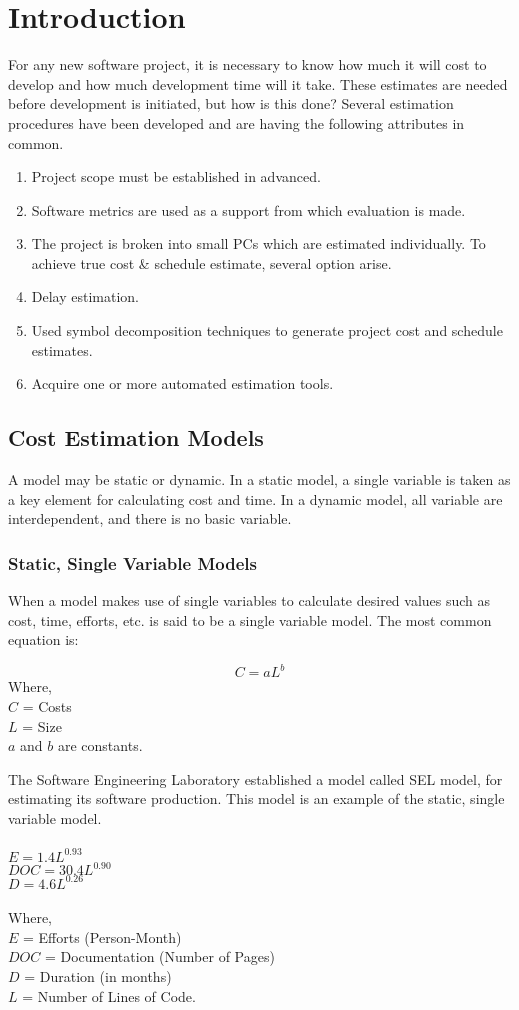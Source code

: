 \chapter{Introduction}
For any new software project, it is necessary to know how much it will cost to develop and how much development time will it take. These estimates are needed before development is initiated, but how is this done? Several estimation procedures have been developed and are having the following attributes in common.

\begin{enumerate}
 \item Project scope must be established in advanced.
 \item Software metrics are used as a support from which evaluation is made.
 \item The project is broken into small PCs which are estimated individually.
  To achieve true cost \& schedule estimate, several option arise.
 \item Delay estimation.
 \item Used symbol decomposition techniques to generate project cost and schedule estimates.
 \item Acquire one or more automated estimation tools.
\end{enumerate}

\section{Cost Estimation Models}
A model may be static or dynamic. In a static model, a single variable is taken as a key element for calculating cost and time. In a dynamic model, all variable are interdependent, and there is no basic variable.

\subsection{Static, Single Variable Models}
When a model makes use of single variables to calculate desired values such as cost, time, efforts, etc. is said to be a single variable model. The most common equation is:

$$C = aL^{b}$$
Where, \\
$C$ = Costs \\
$L$ = Size \\
$a$ and $b$ are constants.

The Software Engineering Laboratory established a model called SEL model, for estimating its software production. This model is an example of the static, single variable model.
\\ \\
$E = 1.4L^{0.93}$ \\
$DOC = 30.4L^{0.90}$ \\
$D = 4.6L^{0.26}$ \\
\\
Where, \\
$E$ = Efforts (Person-Month)\\
$DOC$ = Documentation (Number of Pages) \\
$D$ = Duration (in months) \\
$L$ = Number of Lines of Code.

